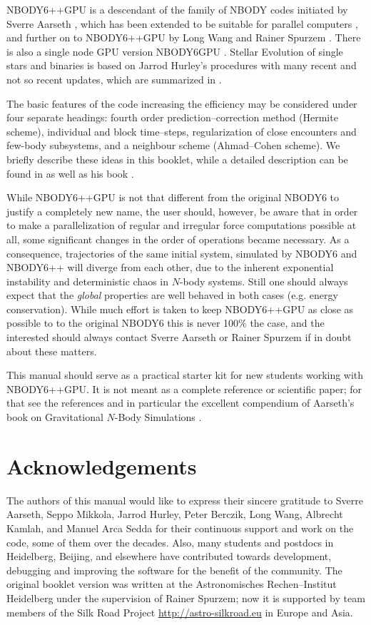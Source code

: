 NBODY6++GPU is a descendant of the family of NBODY codes initiated
by Sverre Aarseth \cite{a_99a}, which has been extended to be
suitable for parallel computers \cite{s_99}, and further on to NBODY6++GPU by Long Wang and Rainer Spurzem \cite{Wang2015, Wang2016,Kamlah2022}. There is also a single node GPU version NBODY6GPU \cite{NA2012}. Stellar Evolution of single stars and binaries is based on Jarrod Hurley's procedures \cite{Hurley2000, Hurley2002, Hurley2005} with many recent and not so recent updates, which are summarized in \cite{Banerjee2020, Kamlah2022}.

The basic features of the code increasing the efficiency may
be considered under four separate headings:
fourth order prediction--correction method (Hermite scheme),
individual and block time--steps,
regularization of close encounters and few-body subsystems,
and a neighbour scheme (Ahmad--Cohen scheme).
We briefly describe these ideas in this booklet, while a
detailed description can be found in \cite{a_93} as well as
his book \cite{a_03}.

While NBODY6++GPU is not that different from the original NBODY6 to justify a completely new name, the user should, however, be
aware that in order to make a parallelization of regular and
irregular force computations possible at all,
some significant changes in the order of operations became 
necessary.
As a consequence, trajectories of the same initial system,
simulated by NBODY6 and NBODY6++ will diverge from each other,
due to the inherent exponential instability and deterministic
chaos in $N$-body systems.
Still one should always expect that the \emph{global}
properties are well behaved in both cases (e.g. energy
conservation).
While much effort is taken to keep NBODY6++GPU as
close as possible to to the original NBODY6 this is never 100\% the case, and the
interested should always contact Sverre Aarseth or Rainer
Spurzem if in doubt about these matters.

This manual should serve as a practical starter kit for
new students working with NBODY6++GPU.
It is not meant as a complete reference or scientific paper;
for that see the references and in particular the excellent
compendium of Aarseth's book on Gravitational
$N$-Body Simulations \cite{a_03}.

\section*{Acknowledgements}

The authors of this manual would like to express their sincere
gratitude to Sverre Aarseth, Seppo Mikkola, Jarrod Hurley, Peter Berczik, Long Wang, Albrecht Kamlah, and Manuel Arca Sedda for their continuous support and work on the code, some of them over the decades.
Also, many students and postdocs in Heidelberg, Beijing, and elsewhere
have contributed towards development, debugging and improving
the software for the benefit of the community.
The original booklet version was written at the Astronomisches Rechen--Institut Heidelberg under the supervision of Rainer Spurzem; now it is supported by team members of  the Silk Road Project \url{http://astro-silkroad.eu} in Europe and Asia.
